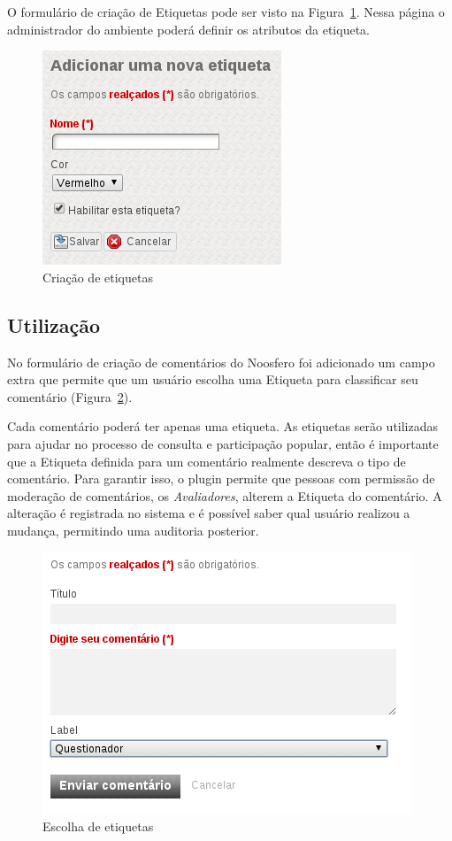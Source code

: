 \documentclass[11pt]{article}
\begin{document}
O formulário de criação de Etiquetas pode ser visto na
Figura~\ref{fig:new-label-page}. Nessa página o administrador
do ambiente poderá definir os atributos da etiqueta.

\begin{figure}[h]
\center
\includegraphics[scale=0.5]{new-label-page.png}
\caption{Criação de etiquetas}
\label{fig:new-label-page}
\end{figure}


\subsection{Utilização}

No formulário de criação de comentários do Noosfero foi adicionado um
campo extra que permite que um usuário escolha uma Etiqueta para
classificar seu comentário (Figura~\ref{fig:comment-add}).

Cada comentário poderá ter apenas uma etiqueta. As etiquetas serão
utilizadas para ajudar no processo de consulta e participação popular,
então é importante que a Etiqueta definida para um comentário realmente
descreva o tipo de comentário. Para garantir isso, o plugin permite que
pessoas com permissão de moderação de comentários, os {\it Avaliadores},
alterem a Etiqueta do comentário. A alteração é registrada no sistema e
é possível saber qual usuário realizou a mudança, permitindo uma
auditoria posterior.

\begin{figure}[h]
\center
\includegraphics[scale=0.5]{comment-add.png}
\caption{Escolha de etiquetas}
\label{fig:comment-add}
\end{figure}
\end{document}

